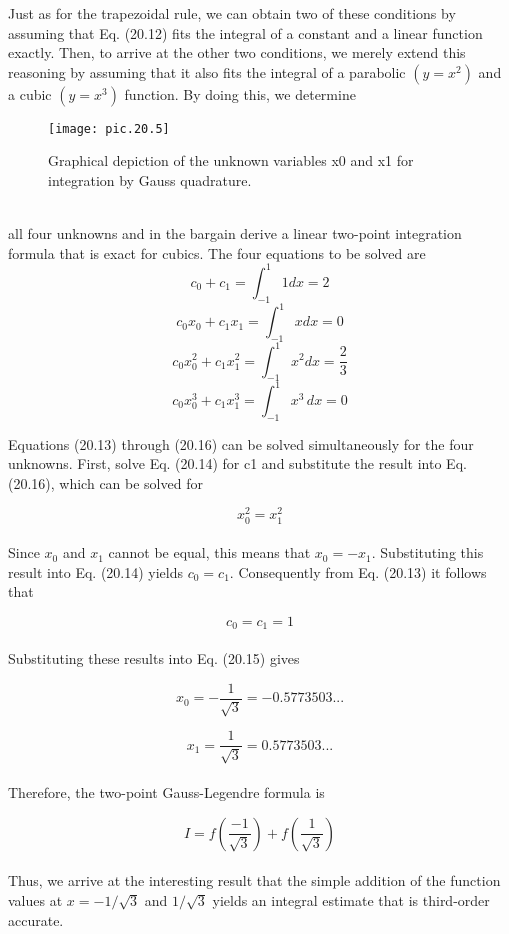 Just as for the trapezoidal rule, we can obtain two of these conditions by assuming
that Eq. (20.12) fits the integral of a constant and a linear function exactly. Then, to arrive at
the other two conditions, we merely extend this reasoning by assuming that it also fits the
integral of a parabolic $(y = x^2)$ and a cubic $(y = x^3)$ function. By doing this, we determine
\pagebreak
\begin{figure}[hbt!]
	\centering
	\texttt{[image: pic.20.5]}
	\caption{\textsf{Graphical depiction of the unknown variables x0 and x1 for integration by Gauss quadrature.}} \hline
	\label{pic.20.5}
\end{figure}\\
all four unknowns and in the bargain derive a linear two-point integration formula that is
exact for cubics. The four equations to be solved are
\begin{equation}
	\tag{20.13}
	c_0+c_1 = \int^{1}_{-1} 1dx = 2
\end{equation}
\begin{equation}
	\tag{20.14}
	c_0 x_0 + c_1 x_1 = \int^{1}_{-1} xdx = 0
\end{equation}
\begin{equation}
	\tag{20.15}
	c_0 x^{2}_{0} + c_1 x^{2}_{1} = \int^{1}_{-1} x^2 dx = \dfrac{2}{3}
\end{equation}
\begin{equation}
	\tag{20.16}
	c_0 x^{3}_{0} + c_1 x^{3}_{1} = \int^{1}_{-1} x^3 \, dx = 0
\end{equation}

Equations (20.13) through (20.16) can be solved simultaneously for the four unknowns.
First, solve Eq. (20.14) for c1 and substitute the result into Eq. (20.16), which can be solved for

	$$x^{2}_{0} = x^{2}_{1}$$\\
Since $x_0$ and $x_1$ cannot be equal, this means that $x_0 = −x_1$. Substituting this result into
Eq. (20.14) yields $c_0 = c_1$. Consequently from Eq. (20.13) it follows that

	$$c_0 = c_1 = 1$$\\
Substituting these results into Eq. (20.15) gives

	$$x_0 = -\dfrac{1}{\sqrt{3}} = −0.5773503 ...$$
	
	$$x_1 = \dfrac{1}{\sqrt{3}} = 0.5773503 ...$$\\
Therefore, the two-point Gauss-Legendre formula is

\begin{equation}
	\tag{20.17}
	I=f \left(\dfrac{-1}{\sqrt{3}} \right) + f \left(\dfrac{1}{\sqrt{3}} \right)
\end{equation}\\
Thus, we arrive at the interesting result that the simple addition of the function values at $x = −1/\sqrt{3}$ and $1/\sqrt{3}$ yields an integral estimate that is third-order accurate.

